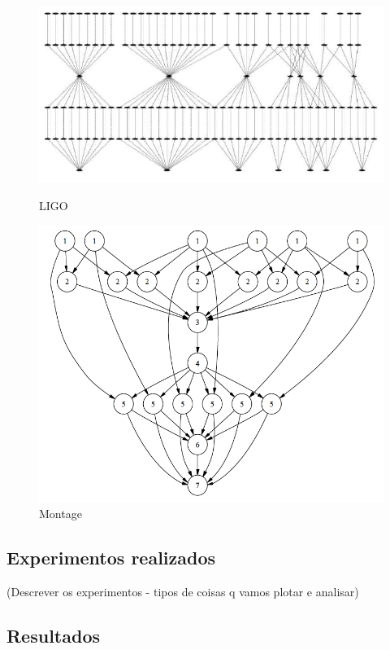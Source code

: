 \documentclass[a4paper,10pt]{article}
\begin{document}
\begin{figure}[!htb]
\centering
\includegraphics[scale=.25]{figures/ligo.png}
\caption{LIGO \protect\cite{bit}}
\label{ligo}

\centering
\includegraphics[scale=.25]{figures/montage.png}
\caption{Montage \protect\cite{bit}}
\label{montage}

\end{figure}

\subsection{Experimentos realizados}

(Descrever os experimentos - tipos de coisas q vamos plotar e analisar)

\subsection{Resultados}
\end{document}
